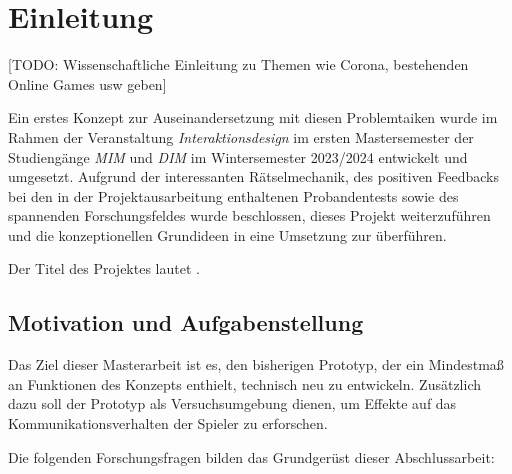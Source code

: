 \chapter{Einleitung}



[TODO: Wissenschaftliche Einleitung zu Themen wie Corona, bestehenden Online Games usw geben]

Ein erstes Konzept zur Auseinandersetzung mit diesen Problemtaiken wurde im Rahmen der Veranstaltung \emph{Interaktionsdesign} im ersten Mastersemester der Studiengänge\emph{ \ac{MIM}} und \emph{\ac{DIM}} im Wintersemester 2023/2024 entwickelt und umgesetzt. 
Aufgrund der interessanten Rätselmechanik, des positiven Feedbacks bei den in der Projektausarbeitung enthaltenen Probandentests sowie des spannenden Forschungsfeldes wurde beschlossen, dieses Projekt weiterzuführen und die konzeptionellen Grundideen in eine Umsetzung zur überführen.

Der Titel des Projektes lautet .

\section{Motivation und Aufgabenstellung}
Das Ziel dieser Masterarbeit ist es, den bisherigen Prototyp, der ein Mindestmaß an Funktionen des Konzepts enthielt, technisch neu zu entwickeln. Zusätzlich dazu soll der Prototyp als Versuchsumgebung dienen, um Effekte auf das Kommunikationsverhalten der Spieler zu erforschen. 

Die folgenden Forschungsfragen bilden das Grundgerüst dieser Abschlussarbeit:


